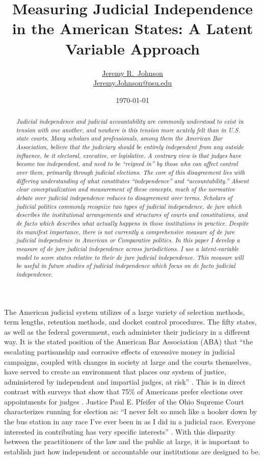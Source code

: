 \documentclass[12pt]{article}
\title{Measuring Judicial Independence in the American States: A Latent Variable Approach}
\author{\href{http://www.jeremyrjohnson.org/}{Jeremy R.\ Johnson}\\ \href{mailto:Jeremy.Johnson@psu.edu}{Jeremy.Johnson@psu.edu}}
\affil{Pennsylvania State University}
\date{\today}
\begin{document}
\maketitle
\thispagestyle{empty}

\begin{abstract}
\textit{Judicial independence and judicial accountability are commonly understood to exist in tension with one another, and nowhere is this tension more acutely felt than in U.S. state courts. Many scholars and professionals, among them the American Bar Association, believe that the judiciary should be entirely independent from any outside influence, be it electoral, executive, or legislative. A contrary view is that judges have become too independent, and need to be “reigned in” by those who can affect control over them, primarily through judicial elections. The core of this disagreement lies with differing understanding of what constitutes “independence” and “accountability.” Absent clear conceptualization and measurement of these concepts, much of the normative debate over judicial independence reduces to disagreement over terms. Scholars of judicial politics commonly recognize two types of judicial independence, de jure which describes the institutional arrangements and structures of courts and constitutions, and de facto which describes what actually happens in those institutions in practice.  Despite its manifest importance, there is not currently a comprehensive measure of de jure judicial independence in American or Comparative politics. In this paper I develop a measure of de jure judicial independence across jurisdictions. I use a latent-variable model to score states relative to their de jure judicial independence. This measure will be useful in future studies of judicial independence which focus on de facto judicial independence.}
\end{abstract}


\pagebreak\doublespacing
\setcounter{page}{1}

The American judicial system utilizes of a large variety of selection methods, term lengths, retention methods, and docket control procedures.  The fifty states, as well as the federal government, each administer their judiciary in a different way.  It is the stated position of the American Bar Association (ABA) that ``the escalating partisanship and corrosive effects of excessive money in judicial campaigns, coupled with changes in society at large and the courts themselves, have served to create an environment that places our system of justice, administered by independent and impartial judges, at risk'' \citep{ABA2003}.  This is in direct contrast with surveys that show that 75\% of Americans prefer elections over appointments for judges \citep{Shepherd2013}. Justice Paul E. Pfeifer of the Ohio Supreme Court characterizes running for election as: ``I never felt so much like a hooker down by the bus station in any race I've ever been in as I did in a judicial race.  Everyone interested in contributing has very specific interests'' \citep{Liptak2006}.  With this disparity between the practitioners of the law and the public at large, it is important to establish just how independent or accountable our institutions are designed to be.
\end{document}
